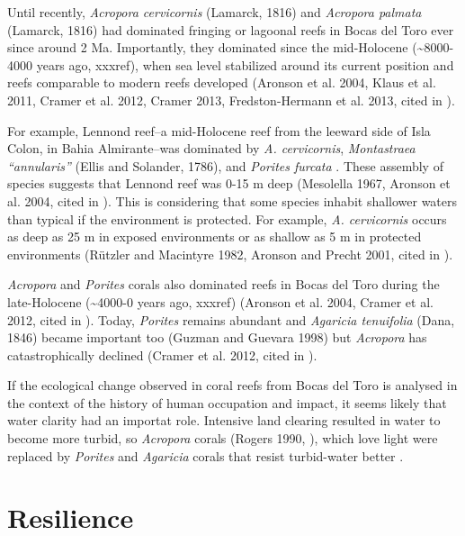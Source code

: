 \documentclass[]{book}
\begin{document}
Until recently, \emph{Acropora cervicornis} (Lamarck, 1816) and
\emph{Acropora palmata} (Lamarck, 1816) had dominated fringing or
lagoonal reefs in Bocas del Toro ever since around 2 Ma. Importantly,
they dominated since the mid-Holocene (\textasciitilde{}8000-4000 years
ago, xxxref), when sea level stabilized around its current position and
reefs comparable to modern reefs developed (Aronson et al. 2004, Klaus
et al. 2011, Cramer et al. 2012, Cramer 2013, Fredston-Hermann et al.
2013, cited in \citet{Schloder_etal_2013}).

For example, Lennond reef--a mid-Holocene reef from the leeward side of
Isla Colon, in Bahia Almirante--was dominated by \emph{A. cervicornis},
\emph{Montastraea ``annularis''} (Ellis and Solander, 1786), and
\emph{Porites furcata} \citep{Fredston_etal_2013}. These assembly of
species suggests that Lennond reef was 0-15 m deep (Mesolella 1967,
Aronson et al. 2004, cited in \citet{Fredston_etal_2013}). This is
considering that some species inhabit shallower waters than typical if
the environment is protected. For example, \emph{A. cervicornis} occurs
as deep as 25 m in exposed environments or as shallow as 5 m in
protected environments (Rützler and Macintyre 1982, Aronson and Precht
2001, cited in \citet{Fredston_etal_2013}).

\emph{Acropora} and \emph{Porites} corals also dominated reefs in Bocas
del Toro during the late-Holocene (\textasciitilde{}4000-0 years ago,
xxxref) (Aronson et al. 2004, Cramer et al. 2012, cited in
\citet{Fredston_etal_2013}). Today, \emph{Porites} remains abundant and
\emph{Agaricia tenuifolia} (Dana, 1846) became important too (Guzman and
Guevara 1998) but \emph{Acropora} has catastrophically declined (Cramer
et al. 2012, cited in \citet{Fredston_etal_2013}).

If the ecological change observed in coral reefs from Bocas del Toro is
analysed in the context of the history of human occupation and impact,
it seems likely that water clarity had an importat role. Intensive land
clearing resulted in water to become more turbid, so \emph{Acropora}
corals (Rogers 1990, \citet{Cramer_etal_2012}), which love light were
replaced by \emph{Porites} and \emph{Agaricia} corals that resist
turbid-water better \citep{Cramer_etal_2012}.

\section{Resilience}\label{resilience}
\end{document}
